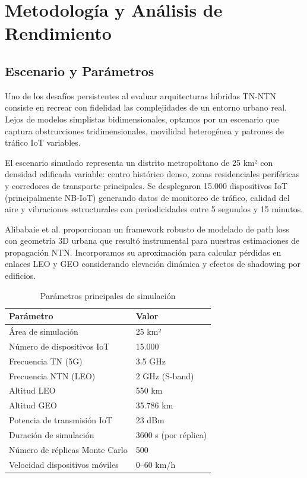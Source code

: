 \section{Metodología y Análisis de Rendimiento}

\subsection{Escenario y Parámetros}

Uno de los desafíos persistentes al evaluar arquitecturas híbridas TN-NTN consiste en recrear con fidelidad las complejidades de un entorno urbano real. Lejos de modelos simplistas bidimensionales, optamos por un escenario que captura obstrucciones tridimensionales, movilidad heterogénea y patrones de tráfico IoT variables.

El escenario simulado representa un distrito metropolitano de 25 km² con densidad edificada variable: centro histórico denso, zonas residenciales periféricas y corredores de transporte principales. Se desplegaron 15.000 dispositivos IoT (principalmente NB-IoT) generando datos de monitoreo de tráfico, calidad del aire y vibraciones estructurales con periodicidades entre 5 segundos y 15 minutos. 

Alibabaie et al. \cite{Alibabaie2025} proporcionan un framework robusto de modelado de path loss con geometría 3D urbana que resultó instrumental para nuestras estimaciones de propagación NTN. Incorporamos su aproximación para calcular pérdidas en enlaces LEO y GEO considerando elevación dinámica y efectos de shadowing por edificios.

\begin{table}[t]
\centering
\caption{Parámetros principales de simulación}
\label{tab:parametros_simulacion}
\begin{tabular}{ll}
\hline
\textbf{Parámetro} & \textbf{Valor} \\
\hline
Área de simulación & 25 km² \\
Número de dispositivos IoT & 15.000 \\
Frecuencia TN (5G) & 3.5 GHz \\
Frecuencia NTN (LEO) & 2 GHz (S-band) \\
Altitud LEO & 550 km \\
Altitud GEO & 35.786 km \\
Potencia de transmisión IoT & 23 dBm \\
Duración de simulación & 3600 s (por réplica) \\
Número de réplicas Monte Carlo & 500 \\
Velocidad dispositivos móviles & 0--60 km/h \\
\hline
\end{tabular}
\end{table}

